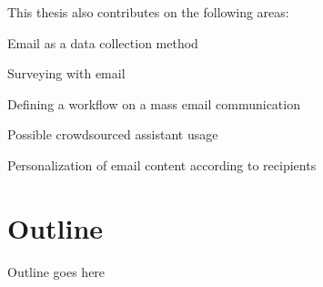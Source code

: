 This thesis also contributes on the following areas:

\begin{compactenum}
	\item Email as a data collection method
	\item Surveying with email
	\item Defining a workflow on a mass email communication
	\item Possible crowdsourced assistant usage
	\item Personalization of email content according to recipients
\end{compactenum}


\section{Outline}
\label{sec:3:Outline}
Outline goes here

